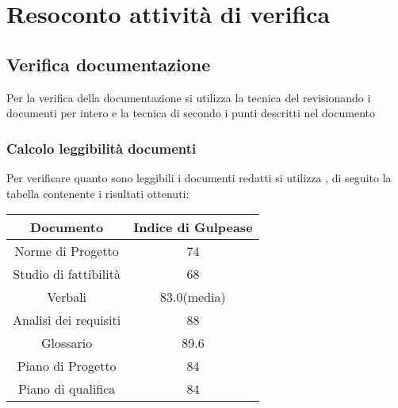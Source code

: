 \section{Resoconto attività di verifica}

\subsection{Verifica documentazione}
Per la verifica della documentazione si utilizza la tecnica del  revisionando i documenti per intero e la tecnica di  secondo i punti descritti nel documento 

\subsubsection{Calcolo leggibilità documenti}
Per verificare quanto sono leggibili i documenti redatti si utilizza , di seguito la tabella contenente i risultati ottenuti:

\begin{center}
	\begin{longtable}{|c|c|}
	\hline
	\rowcolor{lighter-grayer}
	\textbf{Documento} & \textbf{Indice di Gulpease} \\
	\hline
	\endfirsthead

	\hline
	Norme di Progetto &  74 \\
	\hline
	\hline
	Studio di fattibilità & 68 \\
	\hline
	\hline
	Verbali & 83.0(media) \\
	\hline
	\hline
	Analisi dei requisiti & 88 \\
	\hline
	\hline
	Glossario & 89.6 \\
	\hline
	\hline
	Piano di Progetto & 84 \\
	\hline
	\hline
	Piano di qualifica & 84 \\
	\hline

	\end{longtable}
\end{center}